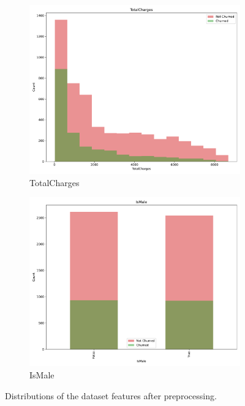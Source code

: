 \documentclass[a4paper,11pt]{article}
\begin{document}
\begin{landscape}
\begin{figure}
\begin{subfigure}{0.14\linewidth}
        \includegraphics[width=\linewidth]{figures/understanding/TotalCharges.pdf}
        \caption{TotalCharges}
    \end{subfigure}
    \begin{subfigure}{0.14\linewidth}
        \includegraphics[width=\linewidth]{figures/understanding/IsMale.pdf}
        \caption{IsMale}
    \end{subfigure}

    \caption{Distributions of the dataset features after preprocessing.}
    \label{fig:all_feature_histograms}
\end{figure}
\end{landscape}
\end{document}
